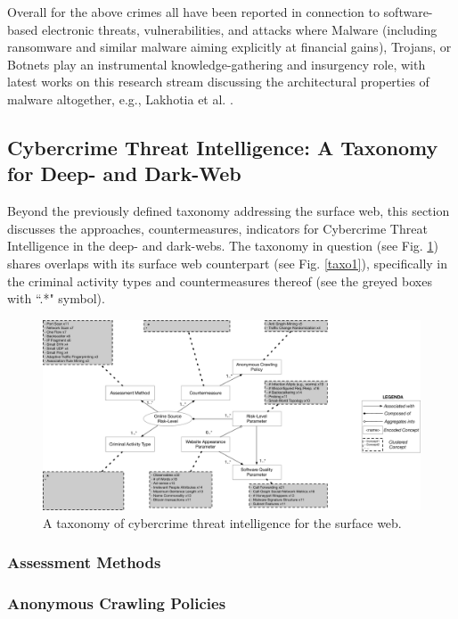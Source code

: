 Overall for the above crimes all have been reported in connection to software-based electronic threats, vulnerabilities, and attacks where Malware (including ransomware and similar malware aiming explicitly at financial gains), Trojans, or Botnets play an instrumental knowledge-gathering and insurgency role, with latest works on this research stream discussing the architectural properties of malware altogether, e.g., Lakhotia et al. \cite{LakhotiaB17}.


\subsection{Cybercrime Threat Intelligence: A Taxonomy for Deep- and Dark-Web}

Beyond the previously defined taxonomy addressing the surface web, this section discusses the approaches, countermeasures, indicators for Cybercrime Threat Intelligence in the deep- and dark-webs. The taxonomy in question (see Fig. \ref{taxo2}) shares overlaps with its surface web counterpart (see Fig. \ref{taxo1}), specifically in the criminal activity types and countermeasures thereof (see the greyed boxes with ``.*" symbol).

\begin{figure}
\begin{center}
\includegraphics[scale=0.3]{./img/taxo2.pdf}
\end{center}
\caption{A taxonomy of cybercrime threat intelligence for the surface web.}\label{taxo2}
\end{figure}


\subsubsection{Assessment Methods}

\subsubsection{Anonymous Crawling Policies}

